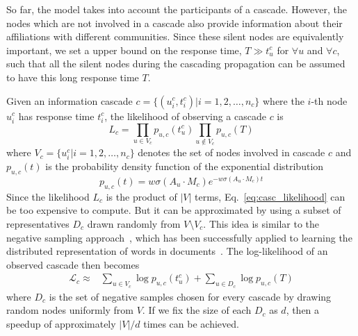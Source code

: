So far, the model takes into account the participants of a cascade. However, the nodes which are not involved in a cascade also provide information about their affiliations with different communities. Since these silent nodes are equivalently important, we set a upper bound on the response time, $T \gg t_u^c $ for $\forall u$ and $\forall c$, such that all the silent nodes during the cascading propagation can be assumed to have this long response time $T$.

Given an information cascade $c=\{(u_i^c, t_i^c) | i=1,2,\dots,n_c\}$ where the $i$-th node $u_i^c$ has response time $t_i^c$, the likelihood of observing a cascade $c$ is
\begin{equation} \label{eq:casc_likelihood}
L_c = \prod_{u\in V_c} p_{u,c}(t_u^c)  \prod_{u \notin V_c}  p_{u,c}(T)
\end{equation}
where $V_c = \{u_i^c | i=1,2,\dots,n_c\}$ denotes the set of nodes involved in cascade $c$ and $p_{u,c}(t)$ is the probability density function of the exponential distribution
\begin{equation} \label{eq:pdf}
p_{u,c}(t) = w\sigma( A_{u} \cdot M_c) e^{-w\sigma( A_{u} \cdot M_c) t}
\end{equation}
Since the likelihood $L_c$ is the product of $|V|$ terms, Eq.~\ref{eq:casc_likelihood} can be too expensive to compute. But it can be approximated by using a subset of representatives $D_c$ drawn randomly from $V\setminus V_c$. This idea is similar to the negative sampling approach~\cite{mnih2012fast}, which has been successfully applied to learning the distributed representation of words in documents~\cite{mikolov2013distributed,ji2016parallelizing}. The log-likelihood of an observed cascade then becomes
\begin{equation} \label{eq:neg}
\begin{array}{rcl}
   \mathcal{L}_c \approx & \sum_{u \in V_c} \log p_{u,c}(t_u^c) + \sum_{u\in D_c} \log p_{u,c}(T)
\end{array}
\end{equation}
where $D_c$ is the set of negative samples chosen for every cascade by drawing random nodes uniformly from $V$. If we fix the size of each $D_c$ as $d$, then a speedup of approximately $|V|/d$ times can be achieved.

